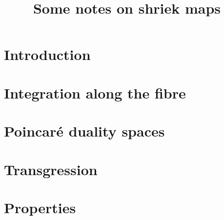 \documentclass[a4paper]{scrartcl}
\title{\vspace{-2em} Some notes on shriek maps}
\begin{document}
\maketitle 

\tableofcontents

\section{Introduction}

\section{Integration along the fibre}

\section{Poincar\'e duality spaces}

\section{Transgression}

\section{Properties}



{}

\end{document}
